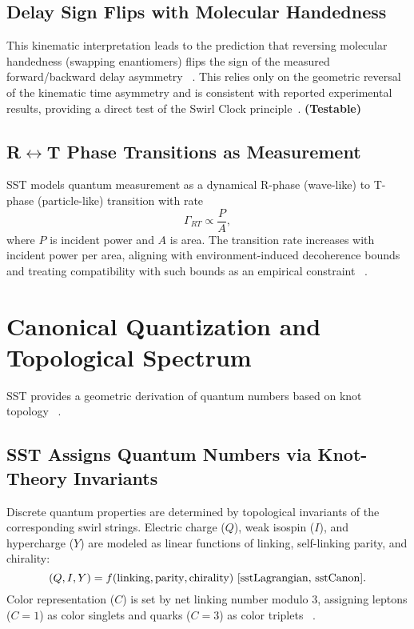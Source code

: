 \documentclass[10pt,reprint,aps,onecolumn,nofootinbib]{revtex4-2}
\newcommand{\testable}{\textbf{(Testable)}}
\begin{document}
    \subsection*{Delay Sign Flips with Molecular Handedness}
        This kinematic interpretation leads to the prediction that reversing molecular handedness (swapping enantiomers) flips the sign of the measured forward/backward delay asymmetry~ \cite{sstAttosecondPhotoionization}. This relies only on the geometric reversal of the kinematic time asymmetry and is consistent with reported experimental results, providing a direct test of the Swirl Clock principle~\cite{sstAttosecondPhotoionization}. \testable

    \subsection*{R$\leftrightarrow$T Phase Transitions as Measurement}
        SST models quantum measurement as a dynamical R-phase (wave-like) to T-phase (particle-like) transition with rate
        \[
            \Gamma_{RT} \propto \frac{P}{A},
        \]
        where $P$ is incident power and $A$ is area. The transition rate increases with incident power per area, aligning with environment-induced decoherence bounds and treating compatibility with such bounds as an empirical constraint~ \cite{sstCanon}.

\section{Canonical Quantization and Topological Spectrum}\label{sec:quantization}
SST provides a geometric derivation of quantum numbers based on knot topology~ \cite{sstCanon,sstLagrangian,Kauffman2001}.

    \subsection*{SST Assigns Quantum Numbers via Knot-Theory Invariants}
        Discrete quantum properties are determined by topological invariants of the corresponding swirl strings. Electric charge ($Q$), weak isospin ($I$), and hypercharge ($Y$) are modeled as linear functions of linking, self-linking parity, and chirality:
        \[
            (Q, I, Y) = f(\text{linking}, \text{parity}, \text{chirality})~\cite{sstLagrangian, sstCanon}.
        \]
        Color representation ($C$) is set by net linking number modulo $3$, assigning leptons ($C=1$) as color singlets and quarks ($C=3$) as color triplets~ \cite{sstLagrangian}.
\end{document}
